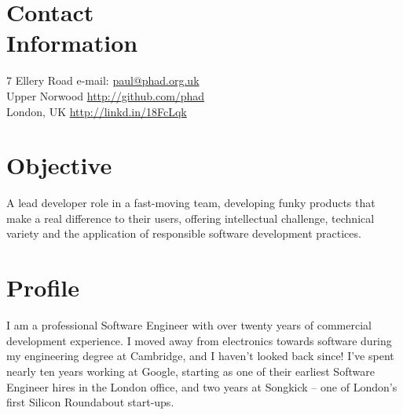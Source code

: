\documentclass[line]{resume}
\begin{document}
\begin{resume}

    \section{\mysidestyle Contact\\Information}

    7 Ellery Road                          \hfill e-mail: \url{paul@phad.org.uk}            \vspace{0mm}\\\vspace{0mm}%
    Upper Norwood                          \hfill \url{http://github.com/phad}              \vspace{0mm}\\\vspace{0mm}%
    London, UK                             \hfill \url{http://linkd.in/18FcLqk}          \vspace{0mm}\\\vspace{-4.5mm}%

    \section{\mysidestyle Objective}

    A lead developer role in a fast-moving team, developing funky products that make a real difference to their users,
    offering intellectual challenge, technical variety and the application of responsible software development
    practices.

    \section{\mysidestyle Profile}

    I am a professional Software Engineer with over twenty years of commercial development experience.  I moved away
    from electronics towards software during my engineering degree at Cambridge, and I haven't looked back since!  I've
    spent nearly ten years working at Google, starting as one of their earliest Software Engineer hires in the London
    office, and two years at Songkick -- one of London's first Silicon Roundabout start-ups. 


\end{resume}
\end{document}
